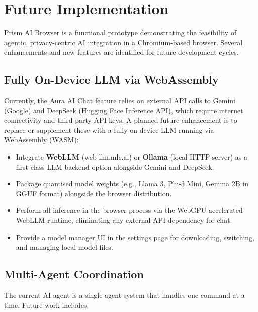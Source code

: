 \chapter{Future Implementation}
\label{chap:future}

Prism AI Browser is a functional prototype demonstrating the feasibility of agentic, privacy-centric AI integration in a Chromium-based browser. Several enhancements and new features are identified for future development cycles.

\section{Fully On-Device LLM via WebAssembly}
Currently, the Aura AI Chat feature relies on external API calls to Gemini (Google) and DeepSeek (Hugging Face Inference API), which require internet connectivity and third-party API keys. A planned future enhancement is to replace or supplement these with a fully on-device LLM running via WebAssembly (WASM):

\begin{itemize}[leftmargin=*]
    \item Integrate \textbf{WebLLM} (web-llm.mlc.ai) or \textbf{Ollama} (local HTTP server) as a first-class LLM backend option alongside Gemini and DeepSeek.
    \item Package quantised model weights (e.g., Llama 3, Phi-3 Mini, Gemma 2B in GGUF format) alongside the browser distribution.
    \item Perform all inference in the browser process via the WebGPU-accelerated WebLLM runtime, eliminating any external API dependency for chat.
    \item Provide a model manager UI in the settings page for downloading, switching, and managing local model files.
\end{itemize}

\section{Multi-Agent Coordination}
The current AI agent is a single-agent system that handles one command at a time. Future work includes:

